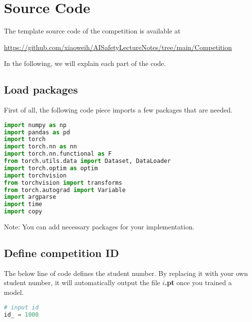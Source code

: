 \section{Source Code}

The template source code of the competition is available at 
\begin{tcolorbox}[center, boxsep=0pt, left=1ex, right=1ex, width = 9cm, before upper=\strut, tcbox width = minimum center, box align=center, halign=center, colback=white, colframe=blue!50!black]
\url{https://github.com/xiaoweih/AISafetyLectureNotes/tree/main/Competition}
\end{tcolorbox}


\vspace{2em}

In the following, we will explain each part of the code. 



\subsection*{Load packages}

First of all, the following code piece imports a few packages that are needed. 

\begin{lstlisting}[language=Python]
import numpy as np
import pandas as pd
import torch
import torch.nn as nn
import torch.nn.functional as F
from torch.utils.data import Dataset, DataLoader
import torch.optim as optim
import torchvision
from torchvision import transforms
from torch.autograd import Variable
import argparse
import time
import copy
\end{lstlisting}

Note: You can add necessary packages for your implementation. 



\subsection*{Define competition ID} The below line of code defines the student number. By replacing it with your own student number, it will automatically output the file $i$\textbf{.pt} once you trained a model. 



\begin{lstlisting}[language=Python]
# input id
id_ = 1000
\end{lstlisting}


